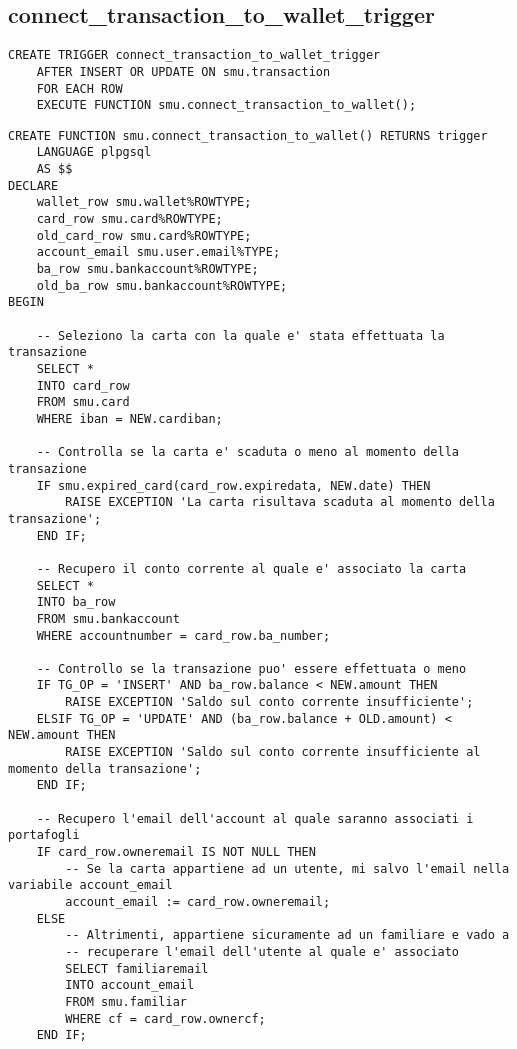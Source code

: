 \subsection{connect\_transaction\_to\_wallet\_trigger}

\begin{lstlisting}
CREATE TRIGGER connect_transaction_to_wallet_trigger
    AFTER INSERT OR UPDATE ON smu.transaction
    FOR EACH ROW
    EXECUTE FUNCTION smu.connect_transaction_to_wallet();
\end{lstlisting}

\begin{lstlisting}
CREATE FUNCTION smu.connect_transaction_to_wallet() RETURNS trigger
    LANGUAGE plpgsql
    AS $$
DECLARE
    wallet_row smu.wallet%ROWTYPE;
    card_row smu.card%ROWTYPE;
    old_card_row smu.card%ROWTYPE;
    account_email smu.user.email%TYPE;
    ba_row smu.bankaccount%ROWTYPE;
    old_ba_row smu.bankaccount%ROWTYPE;
BEGIN

    -- Seleziono la carta con la quale e' stata effettuata la transazione
    SELECT *
    INTO card_row
    FROM smu.card
    WHERE iban = NEW.cardiban;

    -- Controlla se la carta e' scaduta o meno al momento della transazione
    IF smu.expired_card(card_row.expiredata, NEW.date) THEN
        RAISE EXCEPTION 'La carta risultava scaduta al momento della transazione';
    END IF;

    -- Recupero il conto corrente al quale e' associato la carta
    SELECT *
    INTO ba_row
    FROM smu.bankaccount
    WHERE accountnumber = card_row.ba_number;
    
    -- Controllo se la transazione puo' essere effettuata o meno
    IF TG_OP = 'INSERT' AND ba_row.balance < NEW.amount THEN
        RAISE EXCEPTION 'Saldo sul conto corrente insufficiente';
    ELSIF TG_OP = 'UPDATE' AND (ba_row.balance + OLD.amount) < NEW.amount THEN
        RAISE EXCEPTION 'Saldo sul conto corrente insufficiente al momento della transazione';
    END IF;

    -- Recupero l'email dell'account al quale saranno associati i portafogli
    IF card_row.owneremail IS NOT NULL THEN
        -- Se la carta appartiene ad un utente, mi salvo l'email nella variabile account_email
        account_email := card_row.owneremail;
    ELSE
        -- Altrimenti, appartiene sicuramente ad un familiare e vado a
        -- recuperare l'email dell'utente al quale e' associato
        SELECT familiaremail
        INTO account_email
        FROM smu.familiar
        WHERE cf = card_row.ownercf;
    END IF;


\end{lstlisting}
